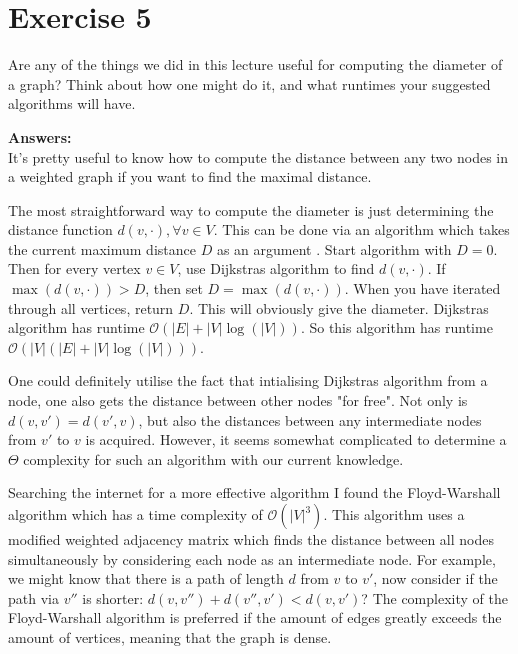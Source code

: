 \documentclass[nobib]{tufte-handout}
\begin{document}
\section{Exercise 5}

Are any of the things we did in this lecture useful for computing the diameter of a graph? Think about how one might do it, and what runtimes your suggested algorithms will have.

\textbf{Answers:}\\

It's pretty useful to know how to compute the distance between any two nodes in a weighted graph if you want to find the maximal distance. 

The most straightforward way to compute the diameter is just determining the distance function  \( d(v, \cdot), \forall v \in V \). This can be done via an algorithm which takes the current maximum distance  \( D \) as an argument . Start algorithm with \( D=0 \). Then for every vertex \( v\in V \), use Dijkstras algorithm to find \( d(v,\cdot) \). If \( \max(d(v,\cdot))>D\), then set \(  D=\max(d(v,\cdot)) \). When you have iterated through all vertices, return \( D\). This will obviously give the diameter. Dijkstras algorithm has runtime \( \mathcal{O}(|E|+|V| \log(|V|)) \). So this algorithm has runtime \( \mathcal{O}(|V|(|E|+|V| \log(|V|))) \). 

One could definitely utilise the fact that intialising Dijkstras algorithm from a node, one also gets the distance between other nodes "for free". Not only is \( d(v,v')=d(v',v) \), but also the distances between any intermediate nodes from \( v' \) to \( v \) is acquired. However, it seems somewhat complicated to determine a \( \Theta \) complexity for such an algorithm with our current knowledge. 

Searching the internet for a more effective algorithm I found the Floyd-Warshall algorithm which has a time complexity of \( \mathcal{O}(|V|^3) \). This algorithm uses a modified weighted adjacency matrix which finds the distance between all nodes simultaneously by considering each node as an intermediate node. For example, we might know that there is a path of length \( d\) from \( v \) to \( v' \), now consider if the path via \( v''\) is shorter: \( d(v,v'')+d(v'',v')<d(v,v') \)? The complexity of the Floyd-Warshall algorithm is preferred if the amount of edges greatly exceeds the amount of vertices, meaning that the graph is dense. 

\newpage
\end{document}
